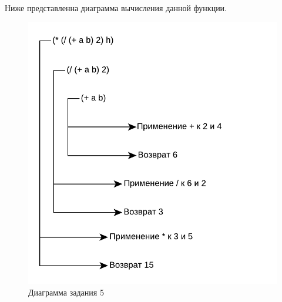 Ниже представленна диаграмма вычисления данной функции.
\begin{figure}[H]
    \centering
    \includegraphics[scale=0.85]{data/pdf/task_2.pdf}
    \caption{Диаграмма задания 5}
\end{figure}
